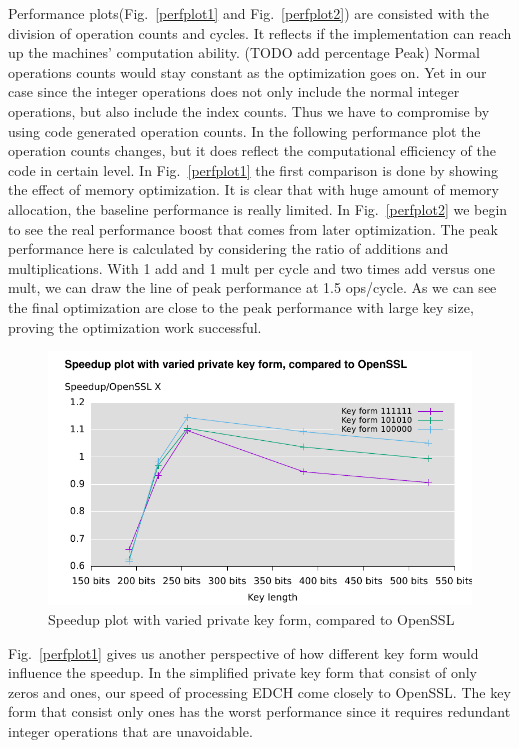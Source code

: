 Performance plots(Fig.~\ref{perfplot1} and Fig.~\ref{perfplot2}) are consisted with the division of operation counts and cycles. It reflects if the implementation can reach up the machines' computation ability. (TODO add percentage Peak) Normal operations counts would stay constant as the optimization goes on. Yet in our case since the integer operations does not only include the normal integer operations, but also include the index counts. Thus we have to compromise by using code generated operation counts. In the following performance plot the operation counts changes, but it does reflect the computational efficiency of the code in certain level. In Fig.~\ref{perfplot1} the first comparison is done by showing the effect of memory optimization. It is clear that with huge amount of memory allocation, the baseline performance is really limited. In Fig.~\ref{perfplot2} we begin to see the real performance boost that comes from later optimization. The peak performance here is calculated by considering the ratio of additions and multiplications. With 1 add and 1 mult per cycle and two times add versus one mult, we can draw the line of peak performance at 1.5 ops/cycle. As we can see the final optimization are close to the peak performance with large key size, proving the optimization work successful.


\begin{figure}[h!]\centering
  \includegraphics[scale=0.7]{keysize}
  \caption{Speedup plot with varied private key form, compared to OpenSSL\label{keysize}}
\end{figure}
Fig.~\ref{perfplot1} gives us another perspective of how different key form would influence the speedup. In the simplified private key form that consist of only zeros and ones, our speed of processing EDCH come closely to OpenSSL. The key form that consist only ones has the worst performance since it requires redundant integer operations that are unavoidable. 